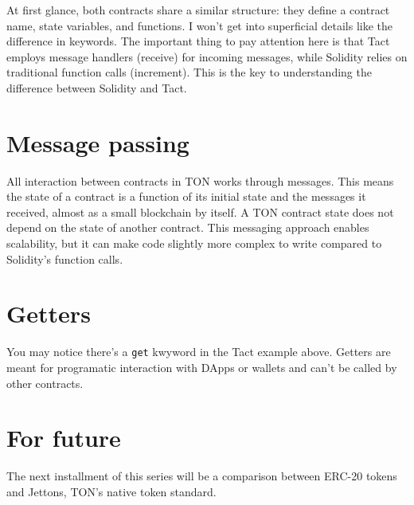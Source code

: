 \documentclass{article}
\begin{document}
At first glance, both contracts share a similar structure: they define a contract name, state variables, and functions. I won't get into superficial details like the difference in keywords. The important thing to pay attention here is that Tact employs message handlers (receive) for incoming messages, while Solidity relies on traditional function calls (increment). This is the key to understanding the difference between Solidity and Tact.

\section{Message passing}

All interaction between contracts in TON works through messages. This means the state of a contract is a function of its initial state and the messages it received, almost as a small blockchain by itself. A TON contract state does not depend on the state of another contract. This messaging approach enables scalability, but it can make code slightly more complex to write compared to Solidity's function calls.

\section{Getters}

You may notice there's a \texttt{get} kwyword in the Tact example above. Getters are meant for programatic interaction with DApps or wallets and can't be called by other contracts.

\section{For future}

The next installment of this series will be a comparison between ERC-20 tokens and Jettons, TON's native token standard.


\end{document}
